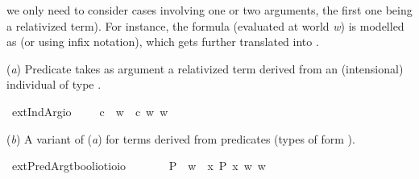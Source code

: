 \begin{isabellebody}
\begin{isamarkuptext}
we only need to consider cases involving one or two arguments, the first one being a relativized term).
For instance, the formula  (evaluated at world \emph{w}) is modelled as 
(or  using infix notation), which gets further translated into .%
\end{isamarkuptext}\isamarkuptrue%
%
\begin{isamarkuptext}%
(\emph{a}) Predicate \isa{{\isasymphi}} takes as argument a relativized term derived from an (intensional) individual of type \isa{{\isasymup}{\isasymzero}}.%
\end{isamarkuptext}\isamarkuptrue%
\isamarkupfalse%
\ extIndArg{\isacharcolon}{\isacharcolon}{\isachardoublequoteopen}{\isasymup}{\isasymlangle}{\isasymzero}{\isasymrangle}{\isasymRightarrow}{\isasymup}{\isasymzero}{\isasymRightarrow}io{\isachardoublequoteclose}\ {\isacharparenleft}\ {\isachardoublequoteopen}{\isasymdownharpoonleft}{\isachardoublequoteclose}{}{}{\isacharparenright}\ \ {\isachardoublequoteopen}{\isasymphi}\ {\isasymdownharpoonleft}c\ {\isasymequiv}\ {\isasymlambda}w{\isachardot}\ {\isasymphi}\ {\isacharparenleft}c\ w{\isacharparenright}\ w{\isachardoublequoteclose}%
\begin{isamarkuptext}%
(\emph{b}) A variant of (\emph{a}) for terms derived from predicates (types of form ).%
\end{isamarkuptext}\isamarkuptrue%
\isamarkupfalse%
\ extPredArg{\isacharcolon}{\isacharcolon}{\isachardoublequoteopen}{\isacharparenleft}{\isacharparenleft}{\isacharprime}t{\isasymRightarrow}bool{\isacharparenright}{\isasymRightarrow}io{\isacharparenright}{\isasymRightarrow}{\isacharparenleft}{\isacharprime}t{\isasymRightarrow}io{\isacharparenright}{\isasymRightarrow}io{\isachardoublequoteclose}\ {\isacharparenleft}\ {\isachardoublequoteopen}{\isasymdown}{\isachardoublequoteclose}\ {}{}{\isacharparenright}\isanewline
\ \ \ {\isachardoublequoteopen}{\isasymphi}\ {\isasymdown}P\ {\isasymequiv}\ {\isasymlambda}w{\isachardot}\ {\isasymphi}\ {\isacharparenleft}{\isasymlambda}x{\isachardot}\ P\ x\ w{\isacharparenright}\ w{\isachardoublequoteclose}%

\end{isabellebody}

